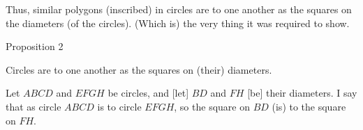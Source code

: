 Thus, similar polygons (inscribed) in circles are to one another
as the squares on the diameters (of the circles). (Which is) the very thing it was required to
show.


\begin{center}
{\large Proposition 2}
\end{center}

Circles are to one another as the squares on (their) diameters.

Let $ABCD$ and $EFGH$ be circles, and [let] $BD$ and $FH$ [be] their diameters.
I say that as circle $ABCD$ is to circle $EFGH$, so the square on $BD$ (is)
to the square on $FH$.

\epsfysize=3in
\centerline{}


